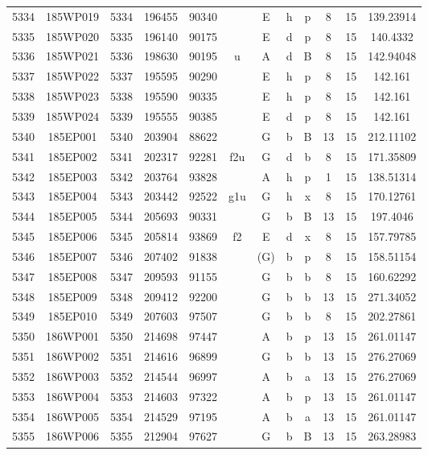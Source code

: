 \begin{tabular}{|*{12}{c|}}
5334 & 185WP019 & 5334 & 196455 & 90340 &  & E & h & p & 8 & 15 & 139.23914 \\ 
5335 & 185WP020 & 5335 & 196140 & 90175 &  & E & d & p & 8 & 15 & 140.4332 \\ 
5336 & 185WP021 & 5336 & 198630 & 90195 & u & A & d & B & 8 & 15 & 142.94048 \\ 
5337 & 185WP022 & 5337 & 195595 & 90290 &  & E & h & p & 8 & 15 & 142.161 \\ 
5338 & 185WP023 & 5338 & 195590 & 90335 &  & E & h & p & 8 & 15 & 142.161 \\ 
5339 & 185WP024 & 5339 & 195555 & 90385 &  & E & d & p & 8 & 15 & 142.161 \\ 
5340 & 185EP001 & 5340 & 203904 & 88622 &  & G & b & B & 13 & 15 & 212.11102 \\ 
5341 & 185EP002 & 5341 & 202317 & 92281 & f2u & G & d & b & 8 & 15 & 171.35809 \\ 
5342 & 185EP003 & 5342 & 203764 & 93828 &  & A & h & p & 1 & 15 & 138.51314 \\ 
5343 & 185EP004 & 5343 & 203442 & 92522 & g1u & G & h & x & 8 & 15 & 170.12761 \\ 
5344 & 185EP005 & 5344 & 205693 & 90331 &  & G & b & B & 13 & 15 & 197.4046 \\ 
5345 & 185EP006 & 5345 & 205814 & 93869 & f2 & E & d & x & 8 & 15 & 157.79785 \\ 
5346 & 185EP007 & 5346 & 207402 & 91838 &  & (G) & b & p & 8 & 15 & 158.51154 \\ 
5347 & 185EP008 & 5347 & 209593 & 91155 &  & G & b & b & 8 & 15 & 160.62292 \\ 
5348 & 185EP009 & 5348 & 209412 & 92200 &  & G & b & b & 13 & 15 & 271.34052 \\ 
5349 & 185EP010 & 5349 & 207603 & 97507 &  & G & b & b & 8 & 15 & 202.27861 \\ 
5350 & 186WP001 & 5350 & 214698 & 97447 &  & A & b & p & 13 & 15 & 261.01147 \\ 
5351 & 186WP002 & 5351 & 214616 & 96899 &  & G & b & b & 13 & 15 & 276.27069 \\ 
5352 & 186WP003 & 5352 & 214544 & 96997 &  & A & b & a & 13 & 15 & 276.27069 \\ 
5353 & 186WP004 & 5353 & 214603 & 97322 &  & A & b & p & 13 & 15 & 261.01147 \\ 
5354 & 186WP005 & 5354 & 214529 & 97195 &  & A & b & a & 13 & 15 & 261.01147 \\ 
5355 & 186WP006 & 5355 & 212904 & 97627 &  & G & b & B & 13 & 15 & 263.28983 \\ 

\end{tabular}
